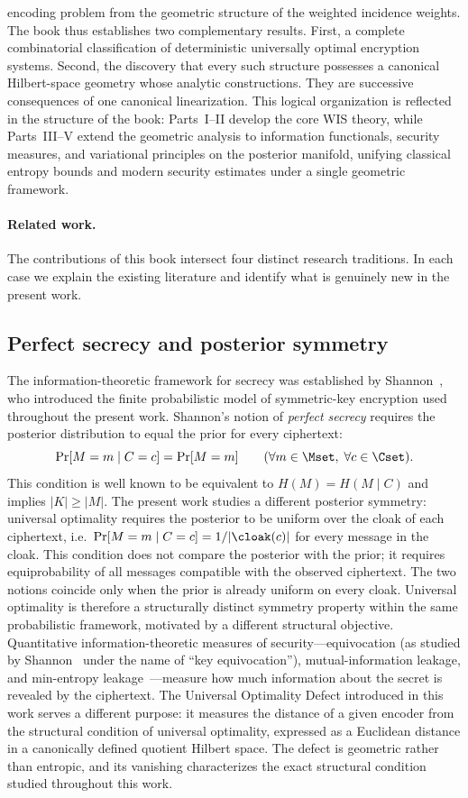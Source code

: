 encoding problem from the geometric structure of the weighted incidence
weights.
The book thus establishes two complementary results.  First, a
complete combinatorial classification of deterministic universally
optimal encryption systems.  Second, the discovery that every such
structure possesses a canonical Hilbert-space geometry whose analytic
constructions.  They are successive consequences of one canonical
linearization.
This logical organization is reflected in the structure of the book:
Parts~I--II develop the core WIS theory, while Parts~III--V extend the
geometric analysis to information functionals, security measures, and
variational principles on the posterior manifold, unifying classical
entropy bounds and modern security estimates under a single geometric
framework.
\paragraph{Related work.}
The contributions of this book intersect four distinct research
traditions.  In each case we explain the existing literature and
identify what is genuinely new in the present work.
\subsection*{Perfect secrecy and posterior symmetry}
The information-theoretic framework for secrecy was established by
Shannon~\cite{shannon1949}, who introduced the finite probabilistic
model of symmetric-key encryption used throughout the present work.
Shannon's notion of \emph{perfect secrecy} requires the posterior
distribution to equal the prior for every ciphertext:
\[
\Pr[M=m\mid C=c]=\Pr[M=m]
\qquad(\forall m\in\Mset,\; \forall c\in\Cset).
\]
This condition is well known to be equivalent to
$H(M)=H(M\mid C)$ and implies $|K|\ge|M|$.
The present work studies a different posterior symmetry:
universal optimality requires the posterior to be uniform over the
cloak of each ciphertext, i.e.~$\Pr[M=m\mid C=c]=1/|\cloak(c)|$
for every message in the cloak.  This condition does not compare the
posterior with the prior; it requires equiprobability of all messages
compatible with the observed ciphertext.  The two notions coincide
only when the prior is already uniform on every cloak.  Universal
optimality is therefore a structurally distinct symmetry property
within the same probabilistic framework, motivated by a different
structural objective.
Quantitative information-theoretic measures of security---equivocation
(as studied by Shannon~\cite{shannon1949} under the name of
``key equivocation''), mutual-information leakage, and min-entropy
leakage~\cite{smith2009foundations}---measure how much information
about the secret is revealed by the ciphertext.  The Universal
Optimality Defect introduced in this work serves a different purpose:
it measures the distance of a given encoder from the structural
condition of universal optimality, expressed as a Euclidean distance
in a canonically defined quotient Hilbert space.  The defect is
geometric rather than entropic, and its vanishing characterizes the
exact structural condition studied throughout this work.
